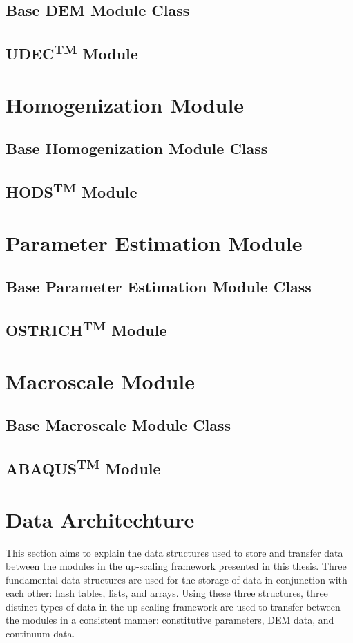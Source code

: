 \subsection{Base DEM Module Class}
\subsection{UDEC\textsuperscript{TM} Module}
\section{Homogenization Module}
\subsection{Base Homogenization Module Class}
\subsection{HODS\textsuperscript{TM} Module}
\section{Parameter Estimation Module}
\subsection{Base Parameter Estimation Module Class}
\subsection{OSTRICH\textsuperscript{TM} Module}
\section{Macroscale Module}
\subsection{Base Macroscale Module Class}
\subsection{ABAQUS\textsuperscript{TM} Module}


\section{Data Architechture}
This section aims to explain the data structures used to store and transfer data between the modules in the up-scaling framework presented in this thesis.  Three fundamental data structures are used for the storage of data in conjunction with each other: hash tables, lists, and arrays. Using these three structures, three distinct types of data in the up-scaling framework are used to transfer between the modules in a consistent manner: constitutive parameters, DEM data, and continuum data.

